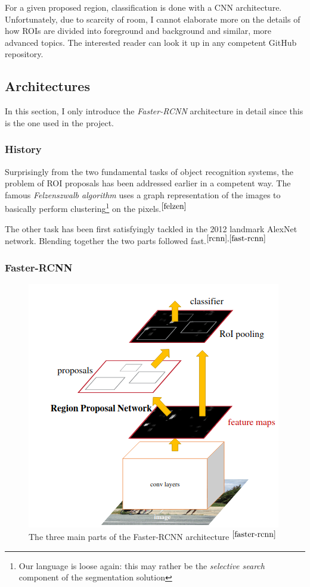 \documentclass{article}
\begin{document}
For a given proposed region, classification is done with a CNN architecture. Unfortunately, due to scarcity of room, I cannot elaborate more on the details of how ROIs are divided into foreground and background and similar, more advanced topics. The interested reader can look it up in any competent GitHub repository.



\subsection{Architectures}

In this section, I only introduce the \textit{Faster-RCNN} architecture in detail since this is the one used in the project.\\

\subsubsection{History}

Surprisingly from the two fundamental tasks of object recognition systems, the problem of ROI proposals has been addressed earlier in a competent way. The famous \textit{Felzenszwalb algorithm} uses a graph representation of the images to basically perform clustering\footnote{Our language is loose again: this may rather be the \textit{selective search} component of the segmentation solution} on the pixels.$^{\cite{felzen}}$

The other task has been first satisfyingly tackled in the 2012 landmark AlexNet network. Blending together the two parts followed fast.$^{\cite{rcnn}, \cite{fast-rcnn}}$  

\subsubsection{Faster-RCNN}


\begin{figure}[h]
  \centering
  \includegraphics[scale=0.5]{fasterrcnn.png}
  \caption{The three main parts of the Faster-RCNN architecture $^{\cite{faster-rcnn}}$}
  \label{fig:faster_rcnn}
\end{figure}
\end{document}

